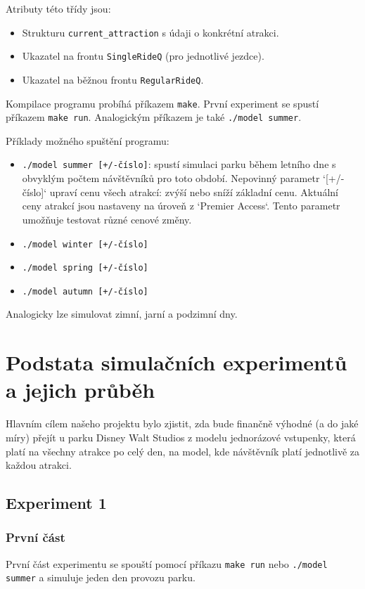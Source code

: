 \documentclass[a4paper,12pt]{article}
\begin{document}
Atributy této třídy jsou: 

\begin{itemize}
    \item Strukturu \texttt{current\_attraction} s údaji o konkrétní atrakci.  
    \item Ukazatel na frontu \texttt{SingleRideQ} (pro jednotlivé jezdce).  
    \item Ukazatel na běžnou frontu \texttt{RegularRideQ}.  
\end{itemize} 


Kompilace programu probíhá příkazem \texttt{make}.  
První experiment se spustí příkazem \texttt{make run}.  
Analogickým příkazem je také \texttt{./model summer}.  

Příklady možného spuštění programu:  
\begin{itemize}
    \item \texttt{./model summer [+/-číslo]}: spustí simulaci parku během letního dne s obvyklým počtem návštěvníků pro toto období. Nepovinný parametr `[+/- číslo]` upraví cenu všech atrakcí: zvýší nebo sníží základní cenu. Aktuální ceny atrakcí jsou nastaveny na úroveň z `Premier Access`. Tento parametr umožňuje testovat různé cenové změny.
    \item \texttt{./model winter [+/-číslo]} 
    \item \texttt{./model spring [+/-číslo]}
    \item \texttt{./model autumn [+/-číslo]}
\end{itemize} 
Analogicky lze simulovat zimní, jarní a podzimní dny.  



\section{Podstata simulačních experimentů a jejich průběh}

Hlavním cílem našeho projektu bylo zjistit, zda bude finančně výhodné (a do jaké míry) přejít u parku Disney Walt Studios z modelu jednorázové vstupenky, která platí na všechny atrakce po celý den, na model, kde návštěvník platí jednotlivě za každou atrakci.

\subsection{Experiment 1}

\subsubsection{První část}
První část experimentu se spouští pomocí příkazu \texttt{make run} nebo \texttt{./model summer} a simuluje jeden den provozu parku.
\end{document}
